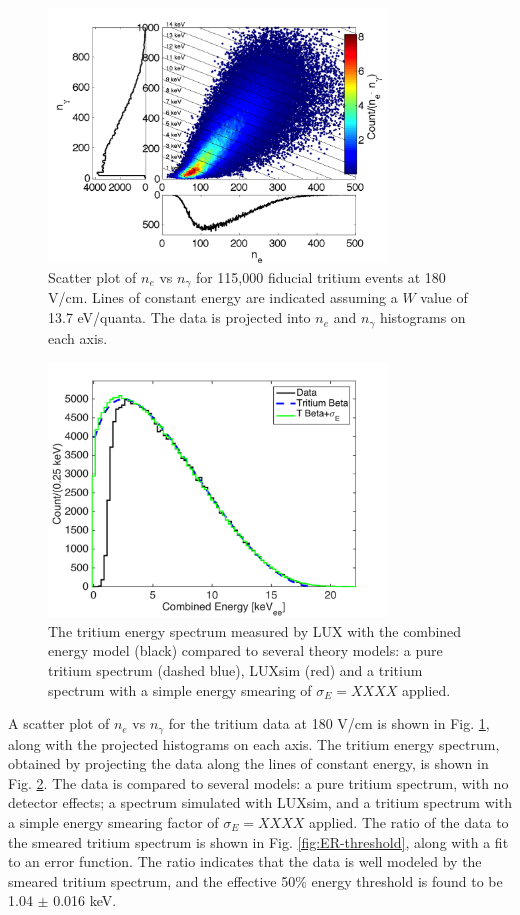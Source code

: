\begin{figure}[h!]\centering
\includegraphics[width=90mm]{fig/tritium-scatter.png}
\caption{Scatter plot of $n_e$ vs $n_{\gamma}$ for 115,000 fiducial tritium events at 180 V/cm. Lines of constant energy are indicated assuming a $W$ value of 13.7 eV/quanta. The data is projected into $n_e$ and $n_{\gamma}$ histograms on each axis.}
\label{fig:tritium-scatter}
\end{figure}


\begin{figure}[h!]
\begin{center}
\includegraphics[width=90mm]{fig/tritium-spectrum-linear.png}
\caption{The tritium energy spectrum measured by LUX with the combined energy model (black) compared to several theory models: a pure tritium spectrum (dashed blue), LUXsim (red) and a tritium spectrum with a simple energy smearing of $\sigma_E = XXXX$ applied. }
\label{fig:tritium-spectrum}
\end{center}
\end{figure}



A scatter plot of $n_e$ vs $n_{\gamma}$ for the tritium data at 180 V/cm is shown in Fig. \ref{fig:tritium-scatter}, along with the projected histograms on each axis. The tritium energy spectrum, obtained by projecting the data along the lines of constant energy, is shown in Fig. \ref{fig:tritium-spectrum}. The data is compared to several models: a pure tritium spectrum, with no detector effects; a spectrum simulated with LUXsim, and a tritium spectrum with a simple energy smearing factor of $\sigma_E = XXXX$ applied. The ratio of the data to the smeared tritium spectrum is shown in Fig. \ref{fig:ER-threshold}, along with a fit to an error function. The ratio indicates that the data is well modeled by the smeared tritium spectrum, and the effective 50\% energy threshold is found to be 1.04 $\pm$ 0.016 keV. 

